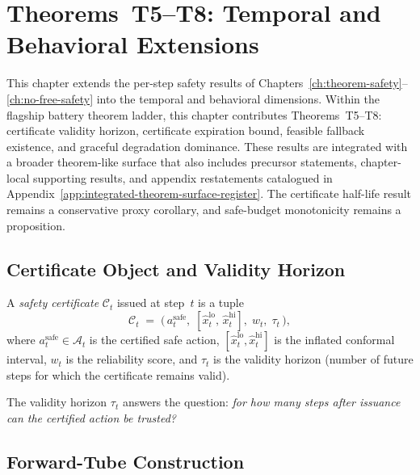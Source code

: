 
\chapter{Theorems~T5--T8: Temporal and Behavioral Extensions}
\label{ch:temporal-extensions}

This chapter extends the per-step safety results of
Chapters~\ref{ch:theorem-safety}--\ref{ch:no-free-safety} into the
temporal and behavioral dimensions.  Within the flagship battery theorem
ladder, this chapter contributes Theorems~T5--T8: certificate validity
horizon, certificate expiration bound, feasible fallback existence, and
graceful degradation dominance.  These results are integrated with a broader
theorem-like surface that also includes precursor statements, chapter-local
supporting results, and appendix restatements catalogued in
Appendix~\ref{app:integrated-theorem-surface-register}.  The certificate
half-life result remains a conservative proxy corollary, and safe-budget
monotonicity remains a proposition.


\section{Certificate Object and Validity Horizon}

\begin{definition}
\label{def:certificate}
A \emph{safety certificate} $\mathcal{C}_t$ issued at step~$t$ is a
tuple
\[
  \mathcal{C}_t \;=\;
  \bigl(\,a_t^{\text{safe}},\;
  [\hat{x}_t^{\text{lo}},\, \hat{x}_t^{\text{hi}}],\;
  w_t,\;
  \tau_t\,\bigr),
\]
where $a_t^{\text{safe}} \in \mathcal{A}_t$ is the certified safe action,
$[\hat{x}_t^{\text{lo}}, \hat{x}_t^{\text{hi}}]$ is the inflated
conformal interval, $w_t$ is the reliability score, and
$\tau_t$ is the validity horizon (number of future steps for which
the certificate remains valid).
\end{definition}

The validity horizon $\tau_t$ answers the question: \emph{for how many
steps after issuance can the certified action be trusted?}

\section{Forward-Tube Construction}

